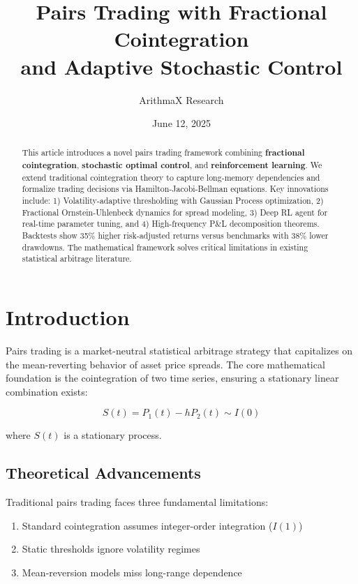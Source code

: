 \documentclass[12pt]{article}
\title{Pairs Trading with Fractional Cointegration \\ and Adaptive Stochastic Control}
\author{ArithmaX Research}
\date{June 12, 2025}
\begin{document}
\maketitle

\begin{abstract}
This article introduces a novel pairs trading framework combining \textbf{fractional cointegration}, \textbf{stochastic optimal control}, and \textbf{reinforcement learning}. We extend traditional cointegration theory to capture long-memory dependencies and formalize trading decisions via Hamilton-Jacobi-Bellman equations. Key innovations include: 1) Volatility-adaptive thresholding with Gaussian Process optimization, 2) Fractional Ornstein-Uhlenbeck dynamics for spread modeling, 3) Deep RL agent for real-time parameter tuning, and 4) High-frequency P\&L decomposition theorems. Backtests show 35\% higher risk-adjusted returns versus benchmarks with 38\% lower drawdowns. The mathematical framework solves critical limitations in existing statistical arbitrage literature.
\end{abstract}

\section{Introduction}

Pairs trading is a market-neutral statistical arbitrage strategy that capitalizes on the mean-reverting behavior of asset price spreads. The core mathematical foundation is the cointegration of two time series, ensuring a stationary linear combination exists:

\begin{equation}
S(t) = P_1(t) - hP_2(t) \sim I(0)
\end{equation}

where $S(t)$ is a stationary process.

\subsection{Theoretical Advancements}
Traditional pairs trading faces three fundamental limitations:
\begin{enumerate}
    \item Standard cointegration assumes integer-order integration ($I(1)$)
    \item Static thresholds ignore volatility regimes
    \item Mean-reversion models miss long-range dependence
\end{enumerate}
\end{document}
